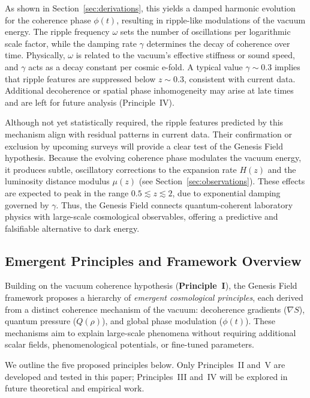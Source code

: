 As shown in Section~\ref{sec:derivations}, this yields a damped harmonic evolution for the coherence phase \( \phi(t) \), resulting in ripple-like modulations of the vacuum energy. The ripple frequency \( \omega \) sets the number of oscillations per logarithmic scale factor, while the damping rate \( \gamma \) determines the decay of coherence over time. Physically, \( \omega \) is related to the vacuum’s effective stiffness or sound speed, and \( \gamma \) acts as a decay constant per cosmic e-fold. A typical value \( \gamma \sim 0.3 \) implies that ripple features are suppressed below \( z \sim 0.3 \), consistent with current data. Additional decoherence or spatial phase inhomogeneity may arise at late times and are left for future analysis (Principle~IV).

Although not yet statistically required, the ripple features predicted by this mechanism align with residual patterns in current data. Their confirmation or exclusion by upcoming surveys will provide a clear test of the Genesis Field hypothesis. Because the evolving coherence phase modulates the vacuum energy, it produces subtle, oscillatory corrections to the expansion rate \( H(z) \) and the luminosity distance modulus \( \mu(z) \) (see Section~\ref{sec:observations}). These effects are expected to peak in the range \( 0.5 \lesssim z \lesssim 2 \), due to exponential damping governed by \( \gamma \). Thus, the Genesis Field connects quantum-coherent laboratory physics with large-scale cosmological observables, offering a predictive and falsifiable alternative to dark energy.

\subsection{Emergent Principles and Framework Overview}
\label{sec:derived_principles}

Building on the vacuum coherence hypothesis (\textbf{Principle~I}), the Genesis Field framework proposes a hierarchy of \emph{emergent cosmological principles}, each derived from a distinct coherence mechanism of the vacuum: decoherence gradients (\( \nabla S \)), quantum pressure (\( Q(\rho) \)), and global phase modulation (\( \phi(t) \)). These mechanisms aim to explain large-scale phenomena without requiring additional scalar fields, phenomenological potentials, or fine-tuned parameters.

We outline the five proposed principles below. Only Principles~II and~V are developed and tested in this paper; Principles~III and~IV will be explored in future theoretical and empirical work.

